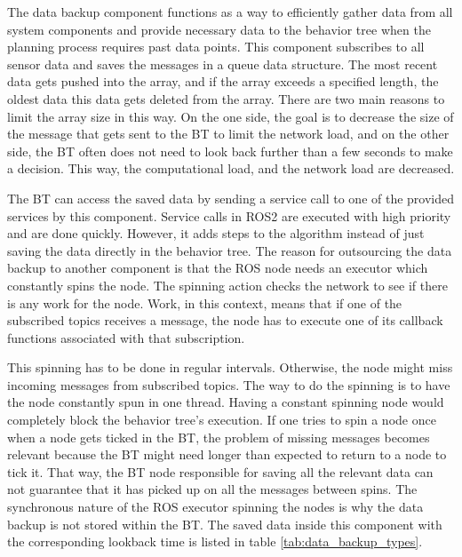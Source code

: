 The data backup component functions as a way to efficiently gather data from all system components and provide necessary data to the behavior tree when the planning process requires past data points. This component subscribes to all sensor data and saves the messages in a queue data structure. The most recent data gets pushed into the array, and if the array exceeds a specified length, the oldest data this data gets deleted from the array. There are two main reasons to limit the array size in this way. On the one side, the goal is to decrease the size of the message that gets sent to the BT to limit the network load, and on the other side, the BT often does not need to look back further than a few seconds to make a decision. This way, the computational load, and the network load are decreased.

The BT can access the saved data by sending a service call to one of the provided services by this component. Service calls in ROS2 are executed with high priority and are done quickly. However, it adds steps to the algorithm instead of just saving the data directly in the behavior tree. The reason for outsourcing the data backup to another component is that the ROS node needs an executor which constantly spins the node. The spinning action checks the network to see if there is any work for the node. Work, in this context, means that if one of the subscribed topics receives a message, the node has to execute one of its callback functions associated with that subscription. 

This spinning has to be done in regular intervals. Otherwise, the node might miss incoming messages from subscribed topics. The way to do the spinning is to have the node constantly spun in one thread. Having a constant spinning node would completely block the behavior tree's execution. If one tries to spin a node once when a node gets ticked in the BT, the problem of missing messages becomes relevant because the BT might need longer than expected to return to a node to tick it. That way, the BT node responsible for saving all the relevant data can not guarantee that it has picked up on all the messages between spins. The synchronous nature of the ROS executor spinning the nodes is why the data backup is not stored within the BT. The saved data inside this component with the corresponding lookback time is listed in table \ref{tab:data_backup_types}. 

